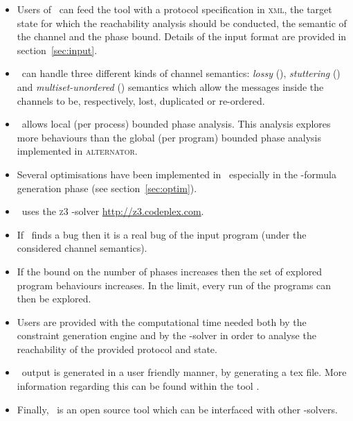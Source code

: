 \begin{itemize}
\item Users of \MPass\ can feed the tool with a protocol specification in \textsc{xml}, the target state for which the reachability analysis should be conducted, the semantic of the channel and the phase bound. Details of the input format are provided in section~\ref{sec:input}.
%
\item \MPass\ can handle three different kinds of channel semantics: {\it lossy} (\LCS), {\it stuttering} (\SLCS) and {\it multiset-unordered} (\UCS) semantics which allow the messages inside the channels to be, respectively, lost, duplicated or re-ordered.
\item \MPass\ allows local (per process) bounded phase analysis.
This analysis explores more behaviours than the global (per program) bounded phase analysis implemented in \textsc{alternator}.
%
\item Several optimisations have been implemented in \MPass\, especially in the \SMT-formula generation phase (see section~\ref{sec:optim}).
%
\item \MPass\ uses the \textsc{z3} \SMT-solver \url{http://z3.codeplex.com}.
\item If \MPass\ finds a bug then it is a real bug of the input program (under the considered channel semantics).
%
\item If the bound on the number of phases increases then the set of explored program behaviours increases.
In the limit, every run of the programs can then be explored.
\item Users are provided with the computational time needed both by the constraint generation engine and by
  the \SMT-solver in order to analyse the reachability of the provided protocol and state.
%
\item \MPass\ output is generated in a user friendly manner, by generating a tex file.
More information regarding this can be found within the tool \cite{github.MPass}.
%
\item Finally, \MPass\ is an open source tool which can be interfaced with other \SMT-solvers.
\end{itemize}


